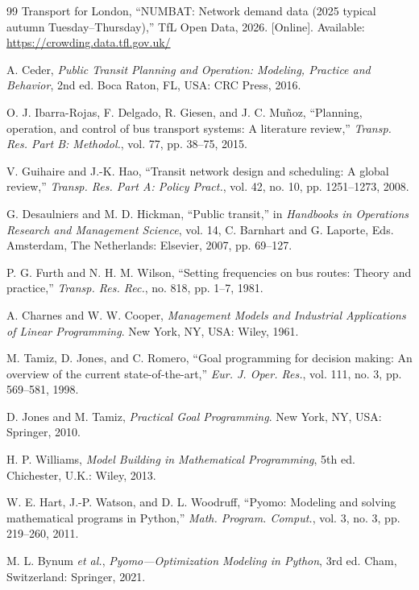 \documentclass[conference]{IEEEtran}
\begin{document}
\begin{thebibliography}{99}
 Transport for London, ``NUMBAT: Network demand data (2025 typical autumn Tuesday--Thursday),'' TfL Open Data, 2026. [Online]. Available: \url{https://crowding.data.tfl.gov.uk/}

 A. Ceder, \emph{Public Transit Planning and Operation: Modeling, Practice and Behavior}, 2nd ed. Boca Raton, FL, USA: CRC Press, 2016.

 O. J. Ibarra-Rojas, F. Delgado, R. Giesen, and J. C. Mu\~{n}oz, ``Planning, operation, and control of bus transport systems: A literature review,'' \emph{Transp. Res. Part B: Methodol.}, vol. 77, pp. 38--75, 2015.

 V. Guihaire and J.-K. Hao, ``Transit network design and scheduling: A global review,'' \emph{Transp. Res. Part A: Policy Pract.}, vol. 42, no. 10, pp. 1251--1273, 2008.

 G. Desaulniers and M. D. Hickman, ``Public transit,'' in \emph{Handbooks in Operations Research and Management Science}, vol. 14, C. Barnhart and G. Laporte, Eds. Amsterdam, The Netherlands: Elsevier, 2007, pp. 69--127.

 P. G. Furth and N. H. M. Wilson, ``Setting frequencies on bus routes: Theory and practice,'' \emph{Transp. Res. Rec.}, no. 818, pp. 1--7, 1981.

 A. Charnes and W. W. Cooper, \emph{Management Models and Industrial Applications of Linear Programming}. New York, NY, USA: Wiley, 1961.

 M. Tamiz, D. Jones, and C. Romero, ``Goal programming for decision making: An overview of the current state-of-the-art,'' \emph{Eur. J. Oper. Res.}, vol. 111, no. 3, pp. 569--581, 1998.

 D. Jones and M. Tamiz, \emph{Practical Goal Programming}. New York, NY, USA: Springer, 2010.

 H. P. Williams, \emph{Model Building in Mathematical Programming}, 5th ed. Chichester, U.K.: Wiley, 2013.

 W. E. Hart, J.-P. Watson, and D. L. Woodruff, ``Pyomo: Modeling and solving mathematical programs in Python,'' \emph{Math. Program. Comput.}, vol. 3, no. 3, pp. 219--260, 2011.

 M. L. Bynum \emph{et al.}, \emph{Pyomo---Optimization Modeling in Python}, 3rd ed. Cham, Switzerland: Springer, 2021.


\end{thebibliography}
\end{document}

